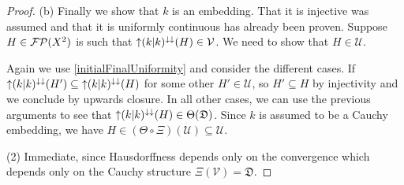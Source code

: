 \begin{proof}
(b) Finally we show that $k$ is an embedding. That it is injective was assumed and that it is uniformly continuous has already been proven. Suppose $H\in \operatorname{\mathcal{FP}}(X^2)$ is such that $\operatorname{\uparrow}(k|k)^{\downarrow\downarrow}(H) \in \mathcal{V}$. We need to show that $H\in\mathcal{U}$.

Again we use \ref{initialFinalUniformity} and consider the different cases. If $\operatorname{\uparrow}(k|k)^{\downarrow\downarrow}(H') \subseteq \operatorname{\uparrow}(k|k)^{\downarrow\downarrow}(H)$ for some other $H'\in \mathcal{U}$, so $H'\subseteq H$ by injectivity and we conclude by upwards closure. In all other cases, we can use the previous arguments to see that $\operatorname{\uparrow}(k|k)^{\downarrow\downarrow}(H) \in \Theta(\mathfrak{D})$. Since $k$ is assumed to be a Cauchy embedding, we have $H\in (\Theta\circ \Xi)(\mathcal{U}) \subseteq \mathcal{U}$.

(2) Immediate, since Hausdorffness depends only on the convergence which depends only on the Cauchy structure $\Xi(\mathcal{V}) = \mathfrak{D}$.
\end{proof}


